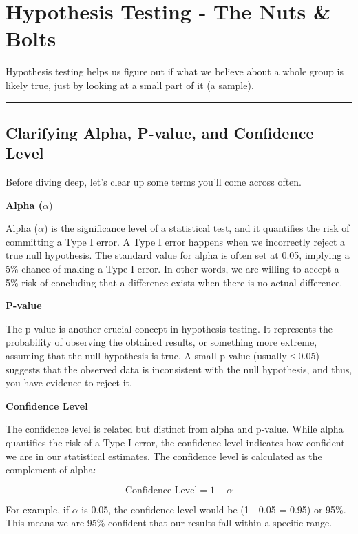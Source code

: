\documentclass[
  letterpaper,
  DIV=11,
  numbers=noendperiod]{scrreprt}
\begin{document}
\section{Hypothesis Testing - The Nuts \&
Bolts}\label{hypothesis-testing---the-nuts-bolts}

Hypothesis testing helps us figure out if what we believe about a whole
group is likely true, just by looking at a small part of it (a sample).

\begin{center}\rule{0.5\linewidth}{0.5pt}\end{center}

\subsection{Clarifying Alpha, P-value, and Confidence
Level}\label{clarifying-alpha-p-value-and-confidence-level}

Before diving deep, let's clear up some terms you'll come across often.

\textbf{Alpha (}\(\alpha\))

Alpha (\(\alpha\)) is the significance level of a statistical test, and
it quantifies the risk of committing a Type I error. A Type I error
happens when we incorrectly reject a true null hypothesis. The standard
value for alpha is often set at 0.05, implying a 5\% chance of making a
Type I error. In other words, we are willing to accept a 5\% risk of
concluding that a difference exists when there is no actual difference.

\textbf{P-value}

The p-value is another crucial concept in hypothesis testing. It
represents the probability of observing the obtained results, or
something more extreme, assuming that the null hypothesis is true. A
small p-value (usually ≤ 0.05) suggests that the observed data is
inconsistent with the null hypothesis, and thus, you have evidence to
reject it.

\textbf{Confidence Level}

The confidence level is related but distinct from alpha and p-value.
While alpha quantifies the risk of a Type I error, the confidence level
indicates how confident we are in our statistical estimates. The
confidence level is calculated as the complement of alpha:

\[
\text{Confidence Level} = 1 - \alpha
\]

For example, if \(\alpha\) is 0.05, the confidence level would be (1 -
0.05 = 0.95) or 95\%. This means we are 95\% confident that our results
fall within a specific range.
\end{document}
